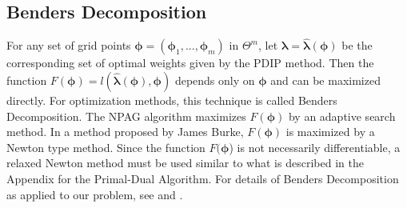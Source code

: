 \subsection{Benders Decomposition}
For any set of grid points $\bm{\phi} = (\bm{\phi}_1, ...,\bm{\phi}_m)$ in $\Theta^m$, 
let $\bm{\lambda} = \bm{\hat{\lambda}}(\bm{\phi})$
 be the corresponding set of optimal weights given by the PDIP  method.
Then the function $F(\bm{\phi}) =l( \bm{\hat{\lambda}}(\bm{\phi}),\bm{\phi})$ depends only on $\bm{\phi}$  and can be maximized directly.
For optimization methods,  this technique  is called Benders Decomposition. The NPAG algorithm maximizes $F(\bm{\phi})$ by an adaptive search method. In a method proposed by James Burke, $F(\bm{\phi})$ is maximized  by a Newton type method. Since the function  $F(\bm{\phi}$) is not necessarily differentiable, a relaxed Newton method must be used similar to what is described in the Appendix for the Primal-Dual Algorithm. For details of Benders Decomposition as applied to our problem,  see  \citet{Baek2006, Bell2012b:Online}  and \citet{Squire2015}.



